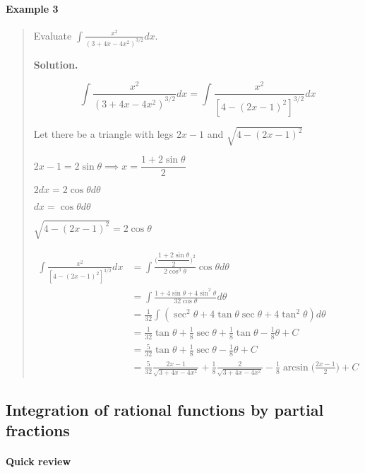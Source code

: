 \documentclass[
]{article}
\begin{document}
\hypertarget{example-3-5}{%
\paragraph*{Example 3}\label{example-3-5}}

\begin{quote}
Evaluate \(\displaystyle \int \frac{x^2}{(3+4x-4x^2)^{3/2}}dx\).

\textbf{Solution.}

\[ \int \frac{x^2}{(3+4x-4x^2)^{3/2}}dx = \int \frac{x^2}{[4 - (2x-1)^2]^{3/2}} dx \]

Let there be a triangle with legs \(2x-1\) and \(\sqrt{4-(2x-1)^2}\)

\(2x-1 = 2 \sin \theta \implies x = \dfrac{1+2\sin\theta}{2}\)

\(2dx = 2\cos \theta d \theta\)

\(dx = \cos \theta d\theta\)

\(\sqrt{4-(2x-1)^2} = 2\cos \theta\)

\begin{align*}
\int \frac{x^2}{[4 - (2x-1)^2]^{3/2}} dx &= \int \frac{\Big(\dfrac{1+ 2\sin\theta}{2}\Big)^2}{2\cos^3 \theta} \cos\theta d\theta\\
&= \int \frac{1 + 4\sin \theta + 4 \sin^2 \theta}{32 \cos \theta} d\theta\\
&= \frac{1}{32} \int(\sec^2\theta + 4 \tan \theta \sec\theta + 4 \tan^2 \theta) d\theta\\
&= \frac{1}{32}\tan \theta + \frac{1}{8} \sec \theta + \frac{1}{8} \tan \theta - \frac{1}{8} \theta + C\\
&= \frac{5}{32}\tan \theta + \frac{1}{8} \sec \theta - \frac{1}{8} \theta + C\\ 
&= \frac{5}{32} \frac{2x-1}{\sqrt{3+4x-4x^2}} + \frac{1}{8} \frac{2}{\sqrt{3+4x-4x^2}} - \frac{1}{8}\arcsin \Big(\frac{2x-1}{2}\Big) + C
\end{align*}
\end{quote}

\hypertarget{integration-of-rational-functions-by-partial-fractions}{%
\subsection{Integration of rational functions by partial
fractions}\label{integration-of-rational-functions-by-partial-fractions}}

\hypertarget{quick-review}{%
\paragraph*{Quick review}\label{quick-review}}
\end{document}

